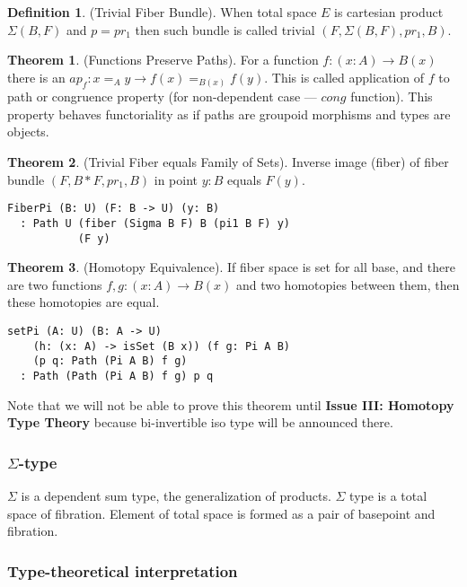 \documentclass[twocolumn,10pt]{article}
\theoremstyle{definition}
\newtheorem{theorem}{Theorem}
\newtheorem{definition}{Definition}
\begin{document}
\begin{definition} (Trivial Fiber Bundle).
When total space $E$ is cartesian product $\Sigma(B,F)$ and $p = pr_1$
then such bundle is called trivial $(F,\Sigma(B,F),pr_1,B)$.
\end{definition}

\begin{theorem} (Functions Preserve Paths).
For a function $f: (x:A) \rightarrow B(x)$
there is an $ap_f : x =_A y \rightarrow f(x) =_{B(x)} f(y)$. This is called
application of $f$ to path or congruence property (for non-dependent case ---
$cong$ function). This property behaves functoriality
as if paths are groupoid morphisms and types are objects.
\end{theorem}

\begin{theorem} (Trivial Fiber equals Family of Sets).
Inverse image (fiber) of fiber bundle $(F,B*F,pr_1,B)$ in point $y:B$ equals $F(y)$.
\begin{lstlisting}
FiberPi (B: U) (F: B -> U) (y: B)
  : Path U (fiber (Sigma B F) B (pi1 B F) y)
           (F y)
\end{lstlisting}
\end{theorem}

\begin{theorem} (Homotopy Equivalence).
If fiber space is set for all base, and
there are two functions $f,g : (x:A) \rightarrow B(x)$ and two
homotopies between them, then these homotopies are equal.
\begin{lstlisting}
setPi (A: U) (B: A -> U)
    (h: (x: A) -> isSet (B x)) (f g: Pi A B)
    (p q: Path (Pi A B) f g)
  : Path (Path (Pi A B) f g) p q
\end{lstlisting}
\end{theorem}

Note that we will not be able to prove this theorem
until {\bf Issue III: Homotopy Type Theory} because
bi-invertible iso type will be announced there.

\subsubsection{$\Sigma$-type}

$\Sigma$ is a dependent sum type, the generalization of products.
$\Sigma$ type is a total space of fibration. Element of total
space is formed as a pair of basepoint and fibration.

\subsubsection*{Type-theoretical interpretation}
\end{document}

